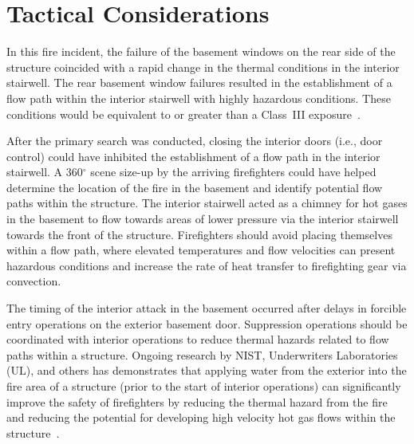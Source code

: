 \documentclass[12pt,oneside]{book}
\begin{document}
%  
% 

\section{Tactical Considerations}
\label{sec:tactical_condsiderations}

In this fire incident, the failure of the basement windows on the rear side of the structure coincided with a rapid change in the thermal conditions in the interior stairwell. The rear basement window failures resulted in the establishment of a flow path within the interior stairwell with highly hazardous conditions. These conditions would be equivalent to or greater than a Class~III exposure~\cite{Donnelly2006}.

After the primary search was conducted, closing the interior doors (i.e., door control) could have inhibited the establishment of a flow path in the interior stairwell. A 360$^\circ$ scene size-up by the arriving firefighters could have helped determine the location of the fire in the basement and identify potential flow paths within the structure. The interior stairwell acted as a chimney for hot gases in the basement to flow towards areas of lower pressure via the interior stairwell towards the front of the structure. Firefighters should avoid placing themselves within a flow path, where elevated temperatures and flow velocities can present hazardous conditions and increase the rate of heat transfer to firefighting gear via convection.

The timing of the interior attack in the basement occurred after delays in forcible entry operations on the exterior basement door. Suppression operations should be coordinated with interior operations to reduce thermal hazards related to flow paths within a structure. Ongoing research by NIST, Underwriters Laboratories (UL), and others has demonstrates that applying water from the exterior into the fire area of a structure (prior to the start of interior operations) can significantly improve the safety of firefighters by reducing the thermal hazard from the fire and reducing the potential for developing high velocity hot gas flows within the structure~\cite{madrzykowski2009fire, kerber2009fire}.
\end{document}
